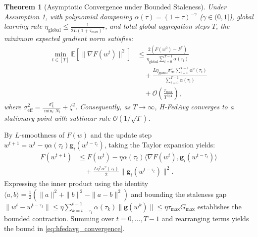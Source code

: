 \documentclass[conference]{IEEEtran}
\newtheorem{theorem}{Theorem}
\begin{document}
\begin{theorem}[Asymptotic Convergence under Bounded Staleness]
Under Assumption 1, with polynomial dampening $\alpha(\tau) = (1 + \tau)^{-\gamma}$ ($\gamma \in (0, 1]$), global learning rate $\eta_{\text{global}} \le \frac{1}{2 L (1 + \tau_{\max})^\gamma}$, and total global aggregation steps $T$, the minimum expected gradient norm satisfies:
\begin{equation}
\begin{aligned}
\min_{t \in [T]} \mathbb{E}\left[\|\nabla F(w^t)\|^2\right] &\le \frac{2(F(w^0) - F^*)}{\eta_{\text{global}} \sum_{t=0}^{T-1} \alpha(\tau_t)} \\
&\quad + \frac{L \eta_{\text{global}} \sigma_{\text{eff}}^2 \sum_{t=0}^{T-1} \alpha^2(\tau_t)}{\sum_{t=0}^{T-1} \alpha(\tau_t)} \\
&\quad + \mathcal{O}\left(\frac{\tau_{\max}}{T^{3/4}}\right),
\end{aligned}
\label{eq:hfedavg_convergence}
\end{equation}
where $\sigma_{\text{eff}}^2 = \frac{\sigma_L^2}{\min_i N_i} + \zeta^2$. Consequently, as $T \to \infty$, H-FedAvg converges to a stationary point with sublinear rate $\mathcal{O}(1/\sqrt{T})$.
\end{theorem}

\begin{IEEEproof}
By $L$-smoothness of $F(w)$ and the update step $w^{t+1} = w^t - \eta \alpha(\tau_t) \mathbf{g}_i(w^{t - \tau_t})$, taking the Taylor expansion yields:
\begin{equation}
\begin{aligned}
F(w^{t+1}) &\le F(w^t) - \eta \alpha(\tau_t) \langle \nabla F(w^t), \mathbf{g}_i(w^{t-\tau_t}) \rangle \\
&\quad + \frac{L \eta^2 \alpha^2(\tau_t)}{2} \|\mathbf{g}_i(w^{t-\tau_t})\|^2.
\end{aligned}
\end{equation}
Expressing the inner product using the identity $\langle a, b \rangle = \frac{1}{2}(\|a\|^2 + \|b\|^2 - \|a-b\|^2)$ and bounding the staleness gap $\|w^t - w^{t-\tau_t}\| \le \eta \sum_{k=t-\tau_t}^{t-1} \alpha(\tau_k) \|\mathbf{g}(w^k)\| \le \eta \tau_{\max} G_{\max}$ establishes the bounded contraction. Summing over $t = 0, \dots, T-1$ and rearranging terms yields the bound in \eqref{eq:hfedavg_convergence}.
\end{IEEEproof}

\end{document}
